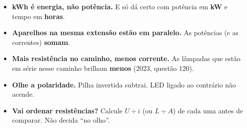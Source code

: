 \begin{pegadinha}
\begin{itemize}
  \item \textbf{kWh é energia, não potência.} E só dá certo com potência em \textbf{kW} e tempo em \textbf{horas}.
  \item \textbf{Aparelhos na mesma extensão estão em paralelo.} As potências (e as correntes) \textbf{somam}.
  \item \textbf{Mais resistência no caminho, menos corrente.} As lâmpadas que estão em série nesse caminho brilham \textbf{menos} (2023, questão 120).
  \item \textbf{Olhe a polaridade.} Pilha invertida subtrai. LED ligado ao contrário não acende.
  \item \textbf{Vai ordenar resistências?} Calcule $U \div i$ (ou $L \div A$) de cada uma antes de comparar. Não decida ``no olho''.
\end{itemize}
\end{pegadinha}

